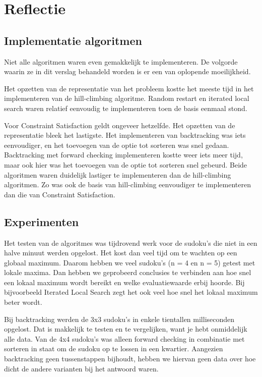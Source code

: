 \documentclass[]{report}
\begin{document}
\chapter{Reflectie}
\section{Implementatie algoritmen}
Niet alle algoritmen waren even gemakkelijk te implementeren. De volgorde waarin ze in dit verslag behandeld worden is er een van oplopende moeilijkheid. 

Het opzetten van de representatie van het probleem kostte het meeste tijd in het implementeren van de hill-climbing algoritme. Random restart en iterated local search waren relatief eenvoudig te implementeren toen de basis eenmaal stond.

Voor Constraint Satisfaction geldt ongeveer hetzelfde. Het opzetten van de representatie bleek het lastigste. Het implementeren van backtracking was iets eenvoudiger, en het toevoegen van de optie tot sorteren was snel gedaan. Backtracking met forward checking implementeren kostte weer iets meer tijd, maar ook hier was het toevoegen van de optie tot sorteren snel gebeurd. Beide algoritmen waren duidelijk lastiger te implementeren dan de hill-climbing algoritmen. Zo was ook de basis van hill-climbing eenvoudiger te implementeren dan die van Constraint Satisfaction.

\section{Experimenten}
Het testen van de algoritmes was tijdrovend werk voor de sudoku's die niet in een halve minuut werden opgelost. Het kost dan veel tijd om te wachten op een globaal maximum. Daarom hebben we veel sudoku's (n = 4 en n = 5) getest met lokale maxima. Dan hebben we geprobeerd conclusies te verbinden aan hoe snel een lokaal maximum wordt bereikt en welke evaluatiewaarde erbij hoorde. Bij bijvoorbeeld Iterated Local Search zegt het ook veel hoe snel het lokaal maximum beter wordt. 

Bij backtracking werden de 3x3 sudoku's in enkele tientallen milliseconden opgelost. Dat is makkelijk te testen en te vergelijken, want je hebt onmiddelijk alle data. Van de 4x4 sudoku's was alleen forward checking in combinatie met sorteren in staat om de sudoku op te lossen in een kwartier. Aangezien backtracking geen tussenstappen bijhoudt, hebben we hiervan geen data over hoe dicht de andere varianten bij het antwoord waren.
\end{document}
